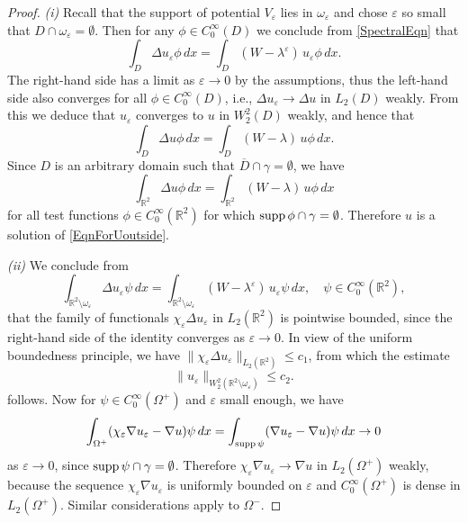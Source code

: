 \documentclass[reqno]{amsart}
\theoremstyle{plain}
\numberwithin{equation}{section}
\newcommand{\supp}{\mathop{\rm supp}}
\newcommand{\Real}{\mathbb R}
\newcommand{\eps}{\varepsilon}
\renewcommand{\leq}{\leqslant}
\begin{document}
\begin{proof}
\textit{(i)} Recall that the support of potential $V_\eps$ lies in $\omega_\eps$ and chose $\eps$  so small that $D\cap \omega_\eps=\emptyset$. Then for any $\phi\in C_0^\infty(D)$ we conclude from \eqref{SpectralEqn} that
 \begin{equation*}
    \int_{D} \Delta u_\eps\phi\,dx=\int_{D} (W-\lambda^\eps)\, u_\eps\phi\,dx.
  \end{equation*}
The right-hand side  has a limit as $\eps\to 0$ by the assumptions, thus the left-hand side also converges for all $\phi\in C_0^\infty(D)$, i.e., $\Delta u_\eps\to \Delta u$ in $L_2(D)$ weakly. From this we deduce that $u_\eps$ converges to $u$ in  $W_2^2(D)$ weakly, and hence that
 \begin{equation*}
    \int_{D} \Delta u\phi\,dx=\int_{D} (W-\lambda)\,u\phi\,dx.
  \end{equation*}
Since $D$ is an arbitrary domain such that $\overline{D}\cap\gamma=\emptyset$,
we have
  \begin{equation*}
    \int_{\Real^2} \Delta u\phi\,dx=\int_{\Real^2} (W-\lambda)\,u\phi\,dx
  \end{equation*}
for all test functions $\phi\in C^\infty_0(\Real^2)$ for which $\supp \phi\cap\gamma=\emptyset$.
Therefore $u$ is a solution of \eqref{EqnForUoutside}.



\textit{(ii)}
We conclude from
 \begin{equation*}
 \int_{\Real^2\setminus\omega_\eps} \Delta u_\eps\psi\,dx=\int_{\Real^2\setminus\omega_\eps} (W-\lambda^\eps)\,u_\eps\psi\,dx,\quad \psi\in C^\infty_0(\Real^2),
  \end{equation*}
that the family of functionals $\chi_\eps \Delta u_\eps$ in $L_2(\Real^2)$
is pointwise bounded, since the right-hand side of the  identity converges as $\eps\to 0$. In view of  the uniform boundedness principle, we have $\|\chi_\eps \Delta u_\eps\|_{L_2(\Real^2)}\leq c_1$,
from which the estimate
 \begin{equation}\label{UepsW22OmegaEps}
   \|u_\eps\|_{W_2^2(\Real^2\setminus\omega_\eps)}\leq c_2.
 \end{equation}
follows. Now for $\psi \in C_0^\infty(\Omega^+)$ and $\eps$ small enough, we have
\begin{equation*}
\int_{\Omega^+}(\chi_{\eps}\nabla u_\eps-\nabla u)\psi\,dx
  =\int_{\supp \psi}(\nabla u_\eps-\nabla u)\psi\,dx\to 0
\end{equation*}
as $\eps\to 0$, since $\supp \psi\cap\gamma=\emptyset$.
Therefore $\chi_{\eps}\nabla u_\eps\to\nabla u$ in $L_2(\Omega^+)$ weakly, because the sequence $\chi_{\eps}\nabla u_\eps$ is uniformly bounded on $\eps$ and $C_0^\infty(\Omega^+)$ is dense in $L_2(\Omega^+)$. Similar considerations apply to $\Omega^-$.



\end{proof}
\end{document}
